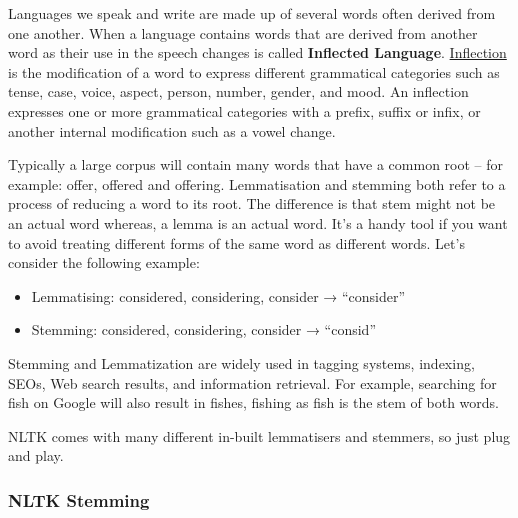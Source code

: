 \documentclass[11pt]{article}
\providecommand{\tightlist}{%
      \setlength{\itemsep}{0pt}\setlength{\parskip}{0pt}}
\begin{document}
Languages we speak and write are made up of several words often derived
from one another. When a language contains words that are derived from
another word as their use in the speech changes is called
\textbf{Inflected Language}.
\href{https://en.wikipedia.org/wiki/Inflection}{Inflection} is the
modification of a word to express different grammatical categories such
as tense, case, voice, aspect, person, number, gender, and mood. An
inflection expresses one or more grammatical categories with a prefix,
suffix or infix, or another internal modification such as a vowel
change.

Typically a large corpus will contain many words that have a common root
-- for example: offer, offered and offering. Lemmatisation and stemming
both refer to a process of reducing a word to its root. The difference
is that stem might not be an actual word whereas, a lemma is an actual
word. It's a handy tool if you want to avoid treating different forms of
the same word as different words. Let's consider the following example:

\begin{itemize}
\tightlist
\item
  Lemmatising: considered, considering, consider → ``consider''
\item
  Stemming: considered, considering, consider → ``consid''
\end{itemize}

Stemming and Lemmatization are widely used in tagging systems, indexing,
SEOs, Web search results, and information retrieval. For example,
searching for fish on Google will also result in fishes, fishing as fish
is the stem of both words.

NLTK comes with many different in-built lemmatisers and stemmers, so
just plug and play.

    \hypertarget{nltk-stemming}{%
\subsubsection{NLTK Stemming}\label{nltk-stemming}}
\end{document}
